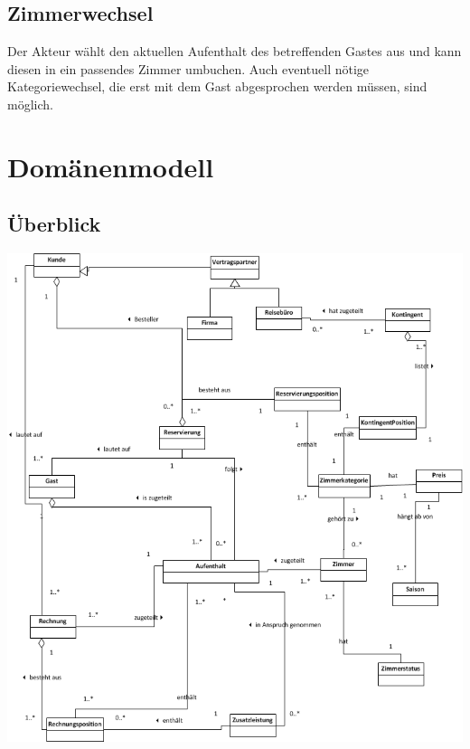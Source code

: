 \documentclass[10pt,a4paper,titlepage]{article}
\begin{document}
\subsection{Zimmerwechsel}
Der Akteur wählt den aktuellen Aufenthalt des betreffenden Gastes aus und kann diesen in ein passendes Zimmer umbuchen. Auch eventuell nötige Kategoriewechsel, die erst mit dem Gast abgesprochen werden müssen, sind möglich.




\newpage


\section{Domänenmodell}
\subsection{Überblick}
\includegraphics[width=\linewidth]{Images/Domaenenmodell_Uebersicht.png}
\end{document}
